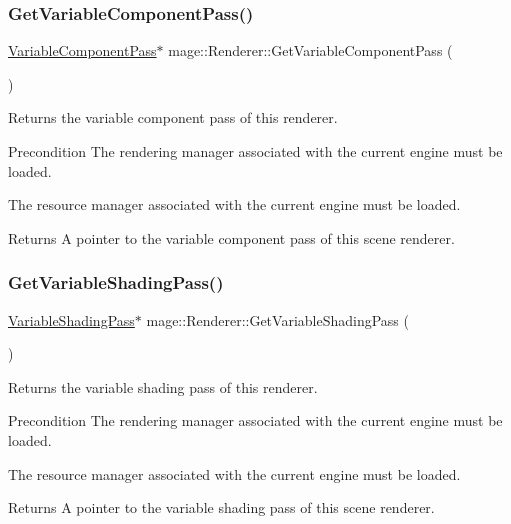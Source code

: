 \subsubsection{\texorpdfstring{Get\+Variable\+Component\+Pass()}{GetVariableComponentPass()}}
{\footnotesize\ttfamily \hyperlink{classmage_1_1_variable_component_pass}{Variable\+Component\+Pass}$\ast$ mage\+::\+Renderer\+::\+Get\+Variable\+Component\+Pass (\begin{DoxyParamCaption}{ }\end{DoxyParamCaption})}

Returns the variable component pass of this renderer.

\begin{DoxyPrecond}{Precondition}
The rendering manager associated with the current engine must be loaded. 

The resource manager associated with the current engine must be loaded. 
\end{DoxyPrecond}
\begin{DoxyReturn}{Returns}
A pointer to the variable component pass of this scene renderer. 
\end{DoxyReturn}
\hypertarget{classmage_1_1_renderer_aaea6458a480c62f8b0b911f16e5058b9}{}\label{classmage_1_1_renderer_aaea6458a480c62f8b0b911f16e5058b9} 
\subsubsection{\texorpdfstring{Get\+Variable\+Shading\+Pass()}{GetVariableShadingPass()}}
{\footnotesize\ttfamily \hyperlink{classmage_1_1_variable_shading_pass}{Variable\+Shading\+Pass}$\ast$ mage\+::\+Renderer\+::\+Get\+Variable\+Shading\+Pass (\begin{DoxyParamCaption}{ }\end{DoxyParamCaption})}

Returns the variable shading pass of this renderer.

\begin{DoxyPrecond}{Precondition}
The rendering manager associated with the current engine must be loaded. 

The resource manager associated with the current engine must be loaded. 
\end{DoxyPrecond}
\begin{DoxyReturn}{Returns}
A pointer to the variable shading pass of this scene renderer. 
\end{DoxyReturn}
\hypertarget{classmage_1_1_renderer_a911673ea96e3182e0d2389d3f02603a2}{}\label{classmage_1_1_renderer_a911673ea96e3182e0d2389d3f02603a2} 
